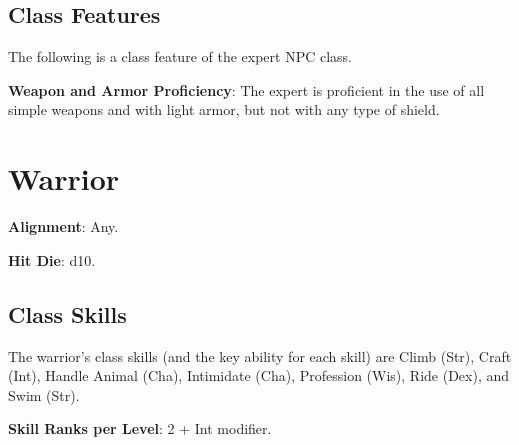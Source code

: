 \subsection{Class Features}

				
The following is a class feature of the expert NPC class.
				
\textbf{Weapon and Armor Proficiency}: The expert is proficient in the use of all simple weapons and with light armor, but not with any type of shield. 
				
\section{Warrior}

				
\textbf{Alignment}: Any.
				
\textbf{Hit Die}: d10.
				
\subsection{Class Skills}

				
The warrior's class skills (and the key ability for each skill) are Climb (Str), Craft (Int), Handle Animal (Cha), Intimidate (Cha), Profession (Wis), Ride (Dex), and Swim (Str).
				
\textbf{Skill Ranks per Level}: 2 + Int modifier.
	
